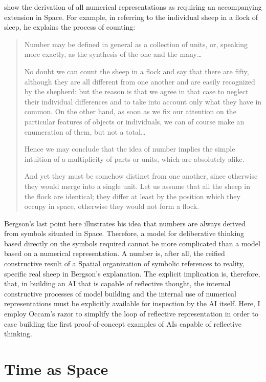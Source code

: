 \cite{bergson:1910} show the derivation of all numerical
representations as requiring an accompanying extension in Space.  For
example, in referring to the individual sheep in a flock of sleep, he
explains the process of counting:

\begin{quote}
Number may be defined in general as a collection of units, or,
speaking more exactly, as the synthesis of the one and the
many\ldots

No doubt we can count the sheep in a flock and say that there are
fifty, although they are all different from one another and are easily
recognized by the shepherd: but the reason is that we agree in that
case to neglect their individual differences and to take into account
only what they have in common.  On the other hand, as soon as we fix
our attention on the particular features of objects or individuals, we
can of course make an enumeration of them, but not a total\ldots

Hence we may conclude that the idea of number implies the simple
intuition of a multiplicity of parts or units, which are absolutely
alike.

And yet they must be somehow distinct from one another, since
otherwise they would merge into a single unit.  Let us assume that all
the sheep in the flock are identical; they differ at least by the
position which they occupy in space, otherwise they would not form a
flock.
\end{quote}

Bergson's last point here illustrates his idea that numbers are always
derived from symbols situated in Space.  Therefore, a model for
deliberative thinking based directly on the symbols required cannot be
more complicated than a model based on a numerical representation.  A
number is, after all, the reified constructive result of a Spatial
organization of symbolic references to reality, specific real sheep in
Bergson's explanation.  The explicit implication is, therefore, that,
in building an AI that is capable of reflective thought, the internal
constructive processes of model building and the internal use of
numerical representations must be explicitly available for inspection
by the AI itself.  Here, I employ Occam's razor to simplify the loop
of reflective representation in order to ease building the first
proof-of-concept examples of AIs capable of reflective thinking.

\section{Time as Space}

